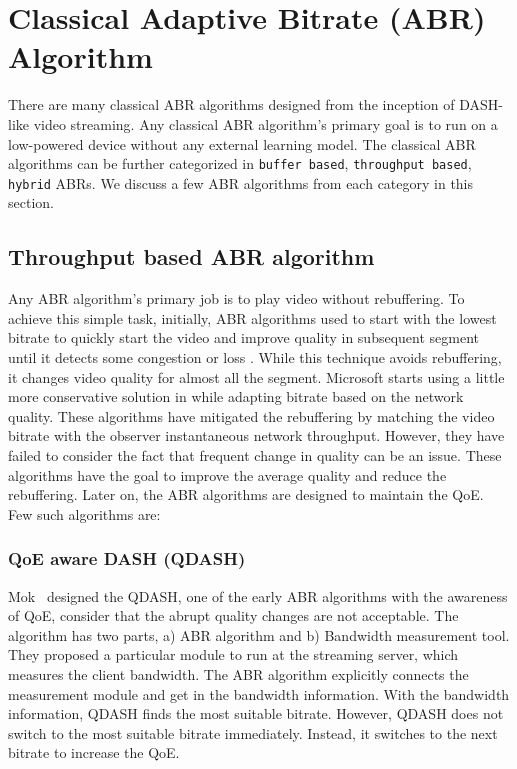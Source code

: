 \section{Classical Adaptive Bitrate (ABR) Algorithm}
There are many classical ABR algorithms designed from the inception of DASH-like video streaming. Any classical ABR algorithm's primary goal is to run on a low-powered device without any external learning model. The classical ABR algorithms can be further categorized in {\tt buffer based}, {\tt throughput based}, {\tt hybrid} ABRs. We discuss a few ABR algorithms from each category in this section.

\subsection{Throughput based ABR algorithm}
Any ABR algorithm's primary job is to play video without rebuffering. To achieve this simple task, initially, ABR algorithms used to start with the lowest bitrate to quickly start the video and improve quality in subsequent segment until it detects some congestion or loss \cite{5677508,10.1145/1943552.1943575}. While this technique avoids rebuffering, it changes video quality for almost all the segment. Microsoft starts using a little more conservative solution in \cite{10.1145/1943552.1943574} while adapting bitrate based on the network quality. These algorithms have mitigated the rebuffering by matching the video bitrate with the observer instantaneous network throughput. However, they have failed to consider the fact that frequent change in quality can be an issue. These algorithms have the goal to improve the average quality and reduce the rebuffering. Later on, the ABR algorithms are designed to maintain the QoE. Few such algorithms are:

\subsubsection{QoE aware DASH (QDASH)}
Mok \etal\ designed the QDASH\cite{10.1145/2155555.2155558}, one of the early ABR algorithms with the awareness of QoE, consider that the abrupt quality changes are not acceptable. The algorithm has two parts, a) ABR algorithm and b) Bandwidth measurement tool. They proposed a particular module to run at the streaming server, which measures the client bandwidth. The ABR algorithm explicitly connects the measurement module and get in the bandwidth information. With the bandwidth information, QDASH finds the most suitable bitrate. However, QDASH does not switch to the most suitable bitrate immediately. Instead, it switches to the next bitrate to increase the QoE.

